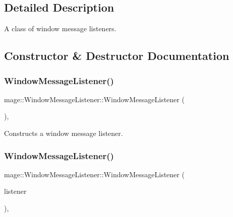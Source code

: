 \subsection{Detailed Description}
A class of window message listeners. 

\subsection{Constructor \& Destructor Documentation}
\hypertarget{classmage_1_1_window_message_listener_aff8433123e461b636275cbdded24ead2}{}\label{classmage_1_1_window_message_listener_aff8433123e461b636275cbdded24ead2} 
\subsubsection{\texorpdfstring{Window\+Message\+Listener()}{WindowMessageListener()}\hspace{0.1cm}{\footnotesize\ttfamily [1/3]}}
{\footnotesize\ttfamily mage\+::\+Window\+Message\+Listener\+::\+Window\+Message\+Listener (\begin{DoxyParamCaption}{ }\end{DoxyParamCaption})\hspace{0.3cm}{\ttfamily [default]}, {\ttfamily [noexcept]}}

Constructs a window message listener. \hypertarget{classmage_1_1_window_message_listener_a41a34991bfeb38d37685b1f8a7d90d1e}{}\label{classmage_1_1_window_message_listener_a41a34991bfeb38d37685b1f8a7d90d1e} 
\subsubsection{\texorpdfstring{Window\+Message\+Listener()}{WindowMessageListener()}\hspace{0.1cm}{\footnotesize\ttfamily [2/3]}}
{\footnotesize\ttfamily mage\+::\+Window\+Message\+Listener\+::\+Window\+Message\+Listener (\begin{DoxyParamCaption}\item[{const \hyperlink{classmage_1_1_window_message_listener}{Window\+Message\+Listener} \&}]{listener }\end{DoxyParamCaption})\hspace{0.3cm}{\ttfamily [default]}, {\ttfamily [noexcept]}}

